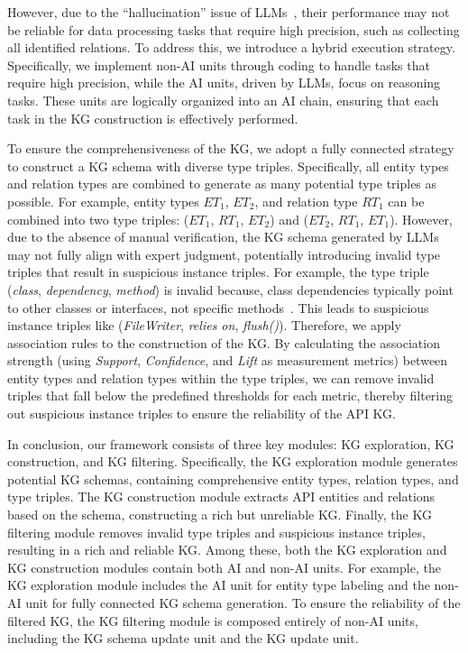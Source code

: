 However, due to the ``hallucination'' issue of LLMs~\cite{huang2024survey, dhuliawala2023chain}, their performance may not be reliable for data processing tasks that require high precision, such as collecting all identified relations.
To address this, we introduce a hybrid execution strategy.
Specifically, we implement non-AI units through coding to handle tasks that require high precision, while the AI units, driven by LLMs, focus on reasoning tasks.
These units are logically organized into an AI chain, ensuring that each task in the KG construction is effectively performed.

To ensure the comprehensiveness of the KG, we adopt a fully connected strategy to construct a KG schema with diverse type triples.
Specifically, all entity types and relation types are combined to generate as many potential type triples as possible.
For example, entity types $ET_1$, $ET_2$, and relation type $RT_1$ can be combined into two type triples: ($ET_1$, $RT_1$, $ET_2$) and ($ET_2$, $RT_1$, $ET_1$).
However, due to the absence of manual verification, the KG schema generated by LLMs may not fully align with expert judgment, potentially introducing invalid type triples that result in suspicious instance triples.
For example, the type triple (\textit{class}, \textit{dependency}, \textit{method}) is invalid because, class dependencies typically point to other classes or interfaces, not specific methods~\cite{martin2000design}.
This leads to suspicious instance triples like (\textit{FileWriter}, \textit{relies on}, \textit{flush()}).
Therefore, we apply association rules to the construction of the KG.
By calculating the association strength (using \textit{Support}, \textit{Confidence}, and \textit{Lift} as measurement metrics) between entity types and relation types within the type triples, we can remove invalid triples that fall below the predefined thresholds for each metric, thereby filtering out suspicious instance triples to ensure the reliability of the API KG.

In conclusion, our framework consists of three key modules: KG exploration, KG construction, and KG filtering.
Specifically, the KG exploration module generates potential KG schemas, containing comprehensive entity types, relation types, and type triples.
The KG construction module extracts API entities and relations based on the schema, constructing a rich but unreliable KG.
Finally, the KG filtering module removes invalid type triples and suspicious instance triples, resulting in a rich and reliable  KG.
Among these, both the KG exploration and KG construction modules contain both AI and non-AI units.
For example, the KG exploration module includes the AI unit for entity type labeling and the non-AI unit for fully connected KG schema generation.
To ensure the reliability of the filtered KG, the KG filtering module is composed entirely of non-AI units, including the KG schema update unit and the KG update unit.

